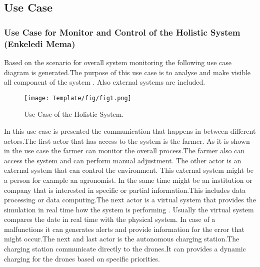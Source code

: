\documentclass[english]{lni}
\begin{document}
\subsection{Use Case}
\subsubsection{Use Case for Monitor  and Control of the Holistic System
(Enkeledi Mema)}
Based on the scenario for overall system monitoring the following use case diagram is generated.The purpose of this use case is to analyse and make visible all component of the system . Also external systems are included.
\begin{figure}[h]
    \texttt{[image: Template/fig/fig1.png]}
    \centering
    \caption{Use Case of the Holistic System.}
\end{figure} 
In this use case is presented the communication that happens in between different actors.The first actor that has access to the system is the farmer. As it is shown in the use case the farmer can monitor the overall process.The farmer also can access the system and can perform manual adjustment. The other actor is an external system that can control the environment. This external system might be a person for example an agronomist. In the same time might be an institution or company that is interested in specific or partial information.This includes data processing or data computing.The next actor is a virtual system that provides the simulation in real time how the system is performing . Usually the virtual system compares the date in real time with the physical system. In case of a malfunctions it can generates alerts and provide information for the error that might occur.The next and last actor is the  autonomous charging station.The charging station communicate directly to the drones.It can provides a dynamic charging for the drones based on specific priorities.



\\
\newpage
\end{document}
